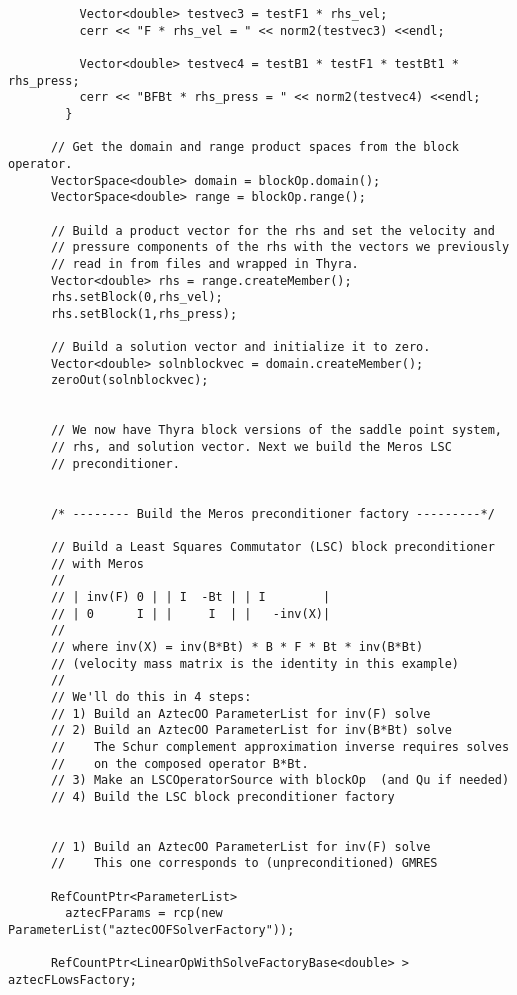 \begin{verbatim}
          Vector<double> testvec3 = testF1 * rhs_vel;
          cerr << "F * rhs_vel = " << norm2(testvec3) <<endl;
	  
          Vector<double> testvec4 = testB1 * testF1 * testBt1 * rhs_press;
          cerr << "BFBt * rhs_press = " << norm2(testvec4) <<endl;
        }

      // Get the domain and range product spaces from the block operator. 
      VectorSpace<double> domain = blockOp.domain();
      VectorSpace<double> range = blockOp.range();

      // Build a product vector for the rhs and set the velocity and
      // pressure components of the rhs with the vectors we previously
      // read in from files and wrapped in Thyra.
      Vector<double> rhs = range.createMember();
      rhs.setBlock(0,rhs_vel);
      rhs.setBlock(1,rhs_press);

      // Build a solution vector and initialize it to zero.
      Vector<double> solnblockvec = domain.createMember();
      zeroOut(solnblockvec);


      // We now have Thyra block versions of the saddle point system,
      // rhs, and solution vector. Next we build the Meros LSC
      // preconditioner.


      /* -------- Build the Meros preconditioner factory ---------*/

      // Build a Least Squares Commutator (LSC) block preconditioner
      // with Meros
      // 
      // | inv(F) 0 | | I  -Bt | | I        |
      // | 0      I | |     I  | |   -inv(X)|
      // 
      // where inv(X) = inv(B*Bt) * B * F * Bt * inv(B*Bt)
      // (velocity mass matrix is the identity in this example)
      //
      // We'll do this in 4 steps:
      // 1) Build an AztecOO ParameterList for inv(F) solve
      // 2) Build an AztecOO ParameterList for inv(B*Bt) solve
      //    The Schur complement approximation inverse requires solves
      //    on the composed operator B*Bt.
      // 3) Make an LSCOperatorSource with blockOp  (and Qu if needed)
      // 4) Build the LSC block preconditioner factory 


      // 1) Build an AztecOO ParameterList for inv(F) solve
      //    This one corresponds to (unpreconditioned) GMRES

      RefCountPtr<ParameterList>
        aztecFParams = rcp(new ParameterList("aztecOOFSolverFactory"));

      RefCountPtr<LinearOpWithSolveFactoryBase<double> > aztecFLowsFactory;


\end{verbatim}
